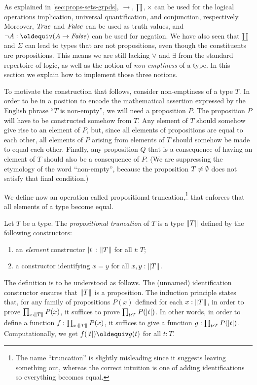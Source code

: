 As explained in \cref{sec:props-sets-grpds}, $\to,\prod,\times$ 
can be used for the logical operations implication, 
universal quantification, and conjunction, respectively.
Moreover, $\mathop{\mathit{True}}$ and $\mathop{\mathit{False}}$ can be used as truth values,
and $\neg A \defeq (A\to\false)$ can be used for negation.
We have also seen that ${\amalg}$ and $\Sigma$ can lead to types
that are not propositions, even though the constituents are
propositions. This means we are still lacking $\vee$ and $\exists$
from the standard repertoire of logic, as well as the notion of {\em non-emptiness} of a type.
In this section we explain how to implement those three notions.

To motivate the construction that follows, consider non-emptiness of a type $T$.  In order to be in a position to encode the mathematical
assertion expressed by the English phrase ``$T$ is non-empty'', we will need a proposition $P$.  The proposition $P$ will have to be constructed
somehow from $T$.  Any element of $T$ should somehow give rise to an element of $P$, but, since all elements of propositions are equal to each
other, all elements of $P$ arising from elements of $T$ should somehow be made to equal each other.  Finally, any proposition $Q$ that is a
consequence of having an element of $T$ should also be a consequence of $P$.  (We are suppressing the etymology of the word ``non-empty'',
because the proposition $T \ne \emptyset$ does not satisfy that final condition.)

We define now an operation called propositional truncation,\footnote{%
The name ``truncation'' is slightly misleading since it suggests leaving
something out, whereas the correct intuition is one of adding identifications
so everything becomes equal.}
that enforces that all elements of a type become equal.

\begin{definition}\label{def:prop-trunc}
Let $T$ be a type. The \emph{propositional truncation} of $T$
is a type  $\lVert T\rVert$ defined by the following constructors:
\begin{enumerate}
\item an \emph{element} constructor $\lvert t\rvert : \lVert T\rVert$ for all $t:T$;
\item a constructor identifying $x=y$  for all $x,y:\lVert T\rVert$.
\end{enumerate}
\end{definition}

The definition is to be understood as follows.
The (unnamed) identification constructor ensures that $\lVert T\rVert$ is a
proposition. The induction principle states that,
for any family of propositions $P(x)$ defined for each $x:\lVert T\rVert$, 
in order to prove $\prod_{x:\lVert T\rVert} P(x)$,
it suffices to prove $\prod_{t:T} P(\lvert t\rvert)$. In other
words, in order to define a function $f:\prod_{x:\lVert T\rVert} P(x)$,
it suffices to give a function $g: \prod_{t:T} P(\lvert t\rvert)$.
Computationally, we get $f(\trunc{t})\jdeq g(t)$ for all $t:T$. 

